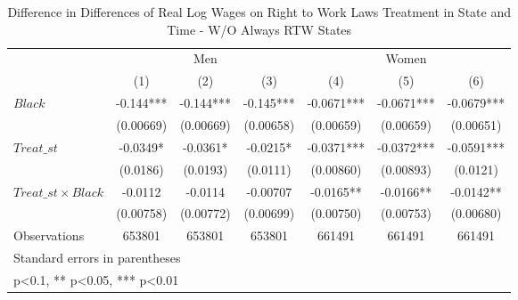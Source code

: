 \begin{table}[htbp]\centering
\def\sym#1{\ifmmode^{#1}\else\(^{#1}\)\fi}
\caption{Difference in Differences of Real Log Wages on Right to Work Laws Treatment in State and Time - W/O Always RTW States}
\begin{tabular}{l*{6}{c}}
\hline\hline
                    &\multicolumn{3}{c}{Men}                        &\multicolumn{3}{c}{Women}                      \\\cmidrule(lr){2-4}\cmidrule(lr){5-7}
                    &\multicolumn{1}{c}{(1)}   &\multicolumn{1}{c}{(2)}   &\multicolumn{1}{c}{(3)}   &\multicolumn{1}{c}{(4)}   &\multicolumn{1}{c}{(5)}   &\multicolumn{1}{c}{(6)}   \\
\hline
$ Black $           &      -0.144***&      -0.144***&      -0.145***&     -0.0671***&     -0.0671***&     -0.0679***\\
                    &   (0.00669)   &   (0.00669)   &   (0.00658)   &   (0.00659)   &   (0.00659)   &   (0.00651)   \\
[1em]
$ Treat\_{st} $      &     -0.0349*  &     -0.0361*  &     -0.0215*  &     -0.0371***&     -0.0372***&     -0.0591***\\
                    &    (0.0186)   &    (0.0193)   &    (0.0111)   &   (0.00860)   &   (0.00893)   &    (0.0121)   \\
[1em]
$ Treat\_{st} \times Black $&     -0.0112   &     -0.0114   &    -0.00707   &     -0.0165** &     -0.0166** &     -0.0142** \\
                    &   (0.00758)   &   (0.00772)   &   (0.00699)   &   (0.00750)   &   (0.00753)   &   (0.00680)   \\
\hline
Observations        &      653801   &      653801   &      653801   &      661491   &      661491   &      661491   \\
\hline\hline
\multicolumn{7}{l}{\footnotesize Standard errors in parentheses}\\
\multicolumn{7}{l}{\footnotesize * p<0.1, ** p<0.05, *** p<0.01}\\
\end{tabular}
\end{table}
